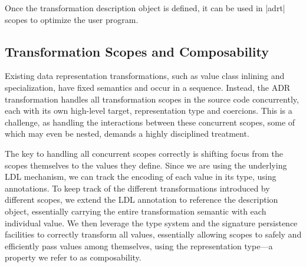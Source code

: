Once the transformation description object is defined, it can be used in |adrt| scopes to optimize the user program.



\subsection{Transformation Scopes and Composability}
\label{sec:ildl:scoped}

Existing data representation transformations, such as value class inlining and specialization, have fixed semantics and occur in a sequence. Instead, the ADR transformation handles all transformation scopes in the source code concurrently, each with its own high-level target, representation type and coercions. This is a challenge, as handling the interactions between these concurrent scopes, some of which may even be nested, demands a highly disciplined treatment.


The key to handling all concurrent scopes correctly is shifting focus from the scopes themselves to the values they define. Since we are using the underlying LDL mechanism, we can track the encoding of each value in its type, using annotations. To keep track of the different transformations introduced by different scopes, we extend the LDL annotation to reference the description object, essentially carrying the entire transformation semantic with each individual value. We then leverage the type system and the signature persistence facilities to correctly transform all values, essentially allowing scopes to safely and efficiently pass values among themselves, using the representation type---a property we refer to as composability.

